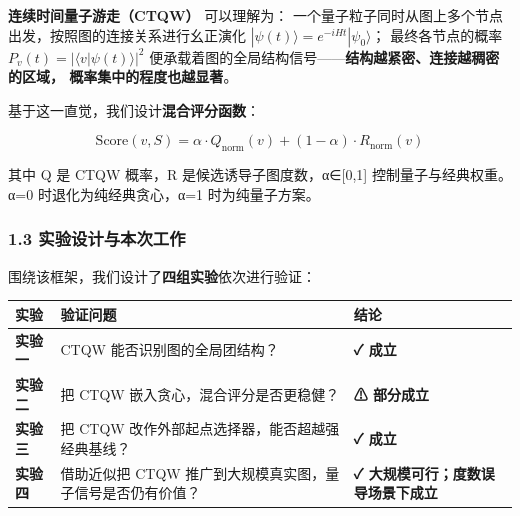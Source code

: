 \documentclass[
  11pt,
]{ctexart}
\newcounter{none} %
\begin{document}
\textbf{连续时间量子游走（CTQW）} 可以理解为：
一个量子粒子同时从图上多个节点出发，按照图的连接关系进行幺正演化
\(|\psi(t)\rangle = e^{-iHt}|\psi_0\rangle\)； 最终各节点的概率
\(P_v(t) = |\langle v|\psi(t)\rangle|^2\)
便承载着图的全局结构信号------\textbf{结构越紧密、连接越稠密的区域，
概率集中的程度也越显著}。

基于这一直觉，我们设计\textbf{混合评分函数}：

\[\text{Score}(v, S) = \alpha \cdot Q_{\text{norm}}(v) + (1-\alpha) \cdot R_{\text{norm}}(v)\]

其中 Q 是 CTQW 概率，R 是候选诱导子图度数，α∈{[}0,1{]}
控制量子与经典权重。 α=0 时退化为纯经典贪心，α=1 时为纯量子方案。

\subsubsection{1.3
实验设计与本次工作}\label{ux5b9eux9a8cux8bbeux8ba1ux4e0eux672cux6b21ux5de5ux4f5c}

围绕该框架，我们设计了\textbf{四组实验}依次进行验证：

{\def\LTcaptype{none} %
\begin{longtable}[]{@{}
  >{\raggedright\arraybackslash}p{}
  >{\raggedright\arraybackslash}p{}
  >{\raggedright\arraybackslash}p{}@{}}
\toprule\noalign{}
\begin{minipage}[b]{\linewidth}\raggedright
实验
\end{minipage} & \begin{minipage}[b]{\linewidth}\raggedright
验证问题
\end{minipage} & \begin{minipage}[b]{\linewidth}\raggedright
结论
\end{minipage} \\
\midrule\noalign{}
\endhead
\bottomrule\noalign{}
\endlastfoot
\textbf{实验一} & CTQW 能否识别图的全局团结构？ & \textbf{✓ 成立} \\
\textbf{实验二} & 把 CTQW 嵌入贪心，混合评分是否更稳健？ & \textbf{⚠
部分成立} \\
\textbf{实验三} & 把 CTQW 改作外部起点选择器，能否超越强经典基线？ &
\textbf{✓ 成立} \\
\textbf{实验四} & 借助近似把 CTQW
推广到大规模真实图，量子信号是否仍有价值？ & \textbf{✓
大规模可行；度数误导场景下成立} \\
\end{longtable}
}
\end{document}
